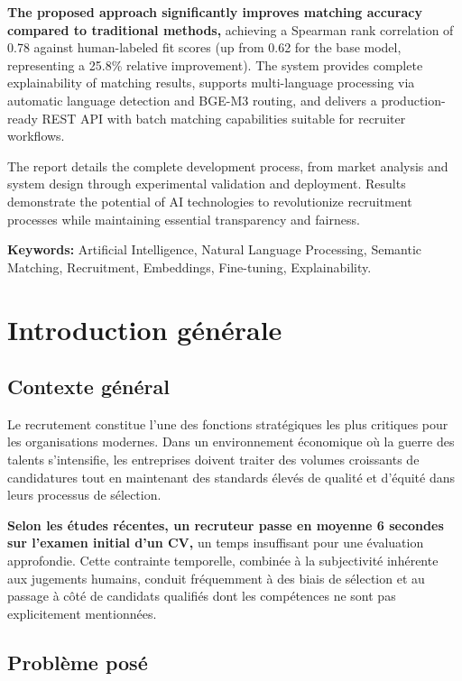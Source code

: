 \documentclass[12pt,a4paper]{report}
\begin{document}
{\color{primarygreen}\large\textbf{The proposed approach significantly improves matching accuracy compared to traditional methods,}} achieving a Spearman rank correlation of 0.78 against human-labeled fit scores (up from 0.62 for the base model, representing a 25.8\% relative improvement). The system provides complete explainability of matching results, supports multi-language processing via automatic language detection and BGE-M3 routing, and delivers a production-ready REST API with batch matching capabilities suitable for recruiter workflows.

The report details the complete development process, from market analysis and system design through experimental validation and deployment. Results demonstrate the potential of AI technologies to revolutionize recruitment processes while maintaining essential transparency and fairness.

{\color{darkgreen}\large\textbf{Keywords:}} Artificial Intelligence, Natural Language Processing, Semantic Matching, Recruitment, Embeddings, Fine-tuning, Explainability.

\chapter{Introduction générale}
\label{chap:introduction}

\section{Contexte général}

Le recrutement constitue l'une des fonctions stratégiques les plus critiques pour les organisations modernes. Dans un environnement économique où la guerre des talents s'intensifie, les entreprises doivent traiter des volumes croissants de candidatures tout en maintenant des standards élevés de qualité et d'équité dans leurs processus de sélection.

{\color{primarygreen}\large\textbf{Selon les études récentes, un recruteur passe en moyenne 6 secondes sur l'examen initial d'un CV,}} un temps insuffisant pour une évaluation approfondie. Cette contrainte temporelle, combinée à la subjectivité inhérente aux jugements humains, conduit fréquemment à des biais de sélection et au passage à côté de candidats qualifiés dont les compétences ne sont pas explicitement mentionnées.

\section{Problème posé}
\end{document}
